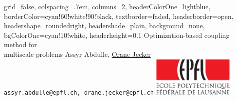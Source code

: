\documentclass[a0paper,fontscale=0.292]{baposter}
\begin{document}
\begin{poster}{
 grid=false,
 colspacing=.7em,
 columns=2,
 headerColorOne=lightblue,
 borderColor=cyan!60!white!90!black,
 textborder=faded,
 headerborder=open,
 headershape=roundedright,
 headershade=plain,
 background=none,
 bgColorOne=cyan!10!white,
 headerheight=0.1\textheight}
 {
 }
 {\sc\Huge Optimization-based coupling method for \\ \vspace{0.1in} multiscale problems}
 {\vspace*{0.2em} Assyr Abdulle, \underline{Orane Jecker}\\[0.5em]
 {\texttt{assyr.abdulle@epfl.ch, orane.jecker@epfl.ch}}}
 {
 \includegraphics[width=4cm]{EPFL_LOG_QUADRI_Red}
 }



\end{poster}
\end{document}
